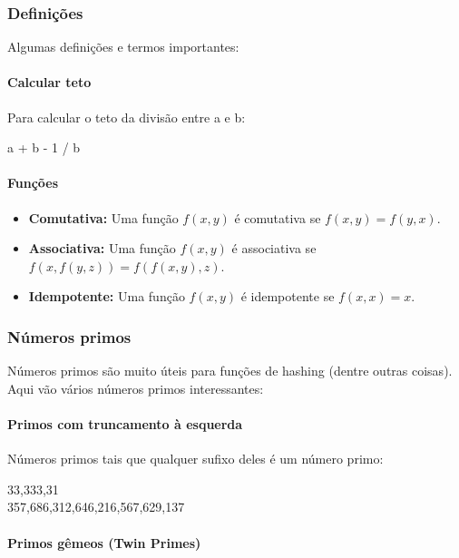 \subsubsection{Definições}

Algumas definições e termos importantes:

\paragraph{Calcular teto}

Para calcular o teto da divisão entre a e b:
\begin{center}
a + b - 1 / b
\end{center}

\paragraph{Funções}

\begin{itemize}\setlength\itemsep{0pt}
    \item \textbf{Comutativa:} Uma função $f(x, y)$ é comutativa se $f(x, y) = f(y, x)$.
    \item \textbf{Associativa:} Uma função $f(x, y)$ é associativa se $f(x, f(y, z)) = f(f(x, y), z)$.
    \item \textbf{Idempotente:} Uma função $f(x, y)$ é idempotente se $f(x, x) = x$.
\end{itemize}

\subsubsection{Números primos}

Números primos são muito úteis para funções de hashing (dentre outras coisas). Aqui vão vários números primos interessantes:

\paragraph{Primos com truncamento à esquerda}

Números primos tais que qualquer sufixo deles é um número primo:
\begin{center}
33,333,31\\
357,686,312,646,216,567,629,137
\end{center}

\paragraph{Primos gêmeos (Twin Primes)}

